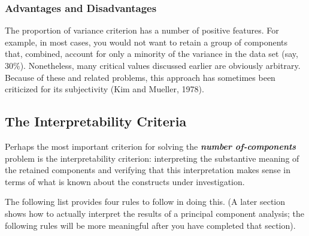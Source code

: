 \documentclass[a4paper,12pt]{article}
\begin{document}
	
	\subsubsection{Advantages and Disadvantages}
	
	The proportion of variance criterion has a number of positive features.  For example, in most
	cases, you would not want to retain a group of components that, combined, account for only a
	minority of the variance in the data set (say, $30\%$).  Nonetheless, many critical values discussed
	earlier are obviously arbitrary.  Because of these and related problems, this approach has sometimes been
	criticized for its subjectivity (Kim and Mueller, 1978).
	
	\subsection{The Interpretability Criteria}
	
	Perhaps the most important criterion for solving the \textbf{\emph{number of-components}} problem is the interpretability criterion:  interpreting the substantive meaning of the retained components and verifying that this interpretation makes sense in terms of what is known about the constructs under investigation.
	
	
	The following list provides four rules to follow in doing this.  (A later section shows how to
	actually interpret the results of a principal component analysis; the following rules will be more
	meaningful after you have completed that section).
	
\end{document}
